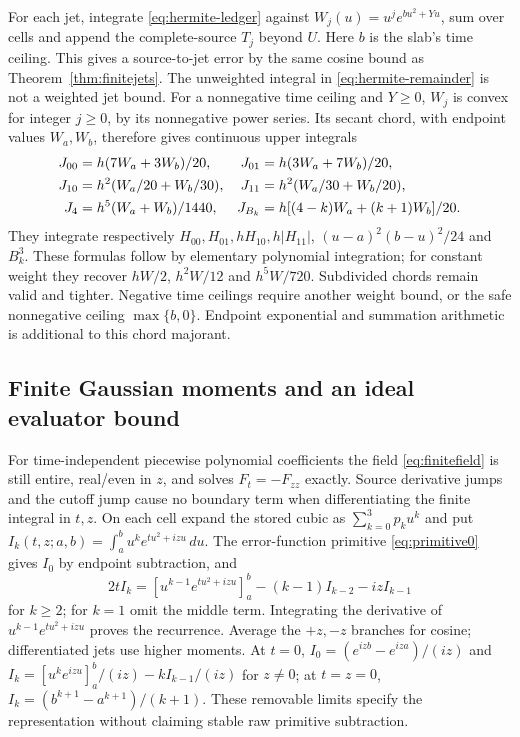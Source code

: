 For each jet, integrate \eqref{eq:hermite-ledger} against
$W_j(u)=u^je^{bu^2+Yu}$, sum over cells and append the complete-source
$T_j$ beyond $U$. Here $b$ is the slab's time ceiling. This gives a
source-to-jet error by the same cosine bound as Theorem~\ref{thm:finitejets}.
The unweighted integral in \eqref{eq:hermite-remainder} is not a
weighted jet bound. For a nonnegative time ceiling and $Y\ge0$,
$W_j$ is convex for integer $j\ge0$, by its nonnegative power series.
Its secant chord, with endpoint values $W_a,W_b$, therefore gives
continuous upper integrals
\begin{align}
 J_{00}&=h(7W_a+3W_b)/20,&J_{01}&=h(3W_a+7W_b)/20,\notag\\
 J_{10}&=h^2(W_a/20+W_b/30),&J_{11}&=h^2(W_a/30+W_b/20),\notag\\
 J_4&=h^5(W_a+W_b)/1440,&
 J_{B_k}&=h[(4-k)W_a+(k+1)W_b]/20.
 \label{eq:hermite-chords}
\end{align}
They integrate respectively $H_{00},H_{01},hH_{10},h|H_{11}|$,
$(u-a)^2(b-u)^2/24$ and $B_k^3$. These formulas follow by elementary
polynomial integration; for constant weight they recover $hW/2$,
$h^2W/12$ and $h^5W/720$. Subdivided chords remain valid and tighter.
Negative time ceilings require another weight bound, or the safe
nonnegative ceiling $\max\{b,0\}$. Endpoint exponential and summation
arithmetic is additional to this chord majorant.

\subsection{Finite Gaussian moments and an ideal evaluator bound}
\label{sec:hermite-evaluator}
For time-independent piecewise polynomial coefficients the field
\eqref{eq:finitefield} is still entire, real/even in $z$, and solves
$F_t=-F_{zz}$ exactly. Source derivative jumps and the cutoff jump cause
no boundary term when differentiating the finite integral in $t,z$.
On each cell expand the stored cubic as $\sum_{k=0}^3p_ku^k$ and put
$I_k(t,z;a,b)=\int_a^bu^ke^{tu^2+izu}\,du$. The error-function primitive
\eqref{eq:primitive0} gives $I_0$ by endpoint subtraction, and
\begin{equation}
 2tI_k=[u^{k-1}e^{tu^2+izu}]_a^b-(k-1)I_{k-2}-izI_{k-1}
 \label{eq:hermite-moments}
\end{equation}
for $k\ge2$; for $k=1$ omit the middle term. Integrating the derivative
of $u^{k-1}e^{tu^2+izu}$ proves the recurrence. Average the $+z,-z$
branches for cosine; differentiated jets use higher moments. At $t=0$,
$I_0=(e^{izb}-e^{iza})/(iz)$ and
$I_k=[u^ke^{izu}]_a^b/(iz)-kI_{k-1}/(iz)$ for $z\ne0$;
at $t=z=0$, $I_k=(b^{k+1}-a^{k+1})/(k+1)$. These removable limits
specify the representation without claiming stable raw primitive subtraction.

